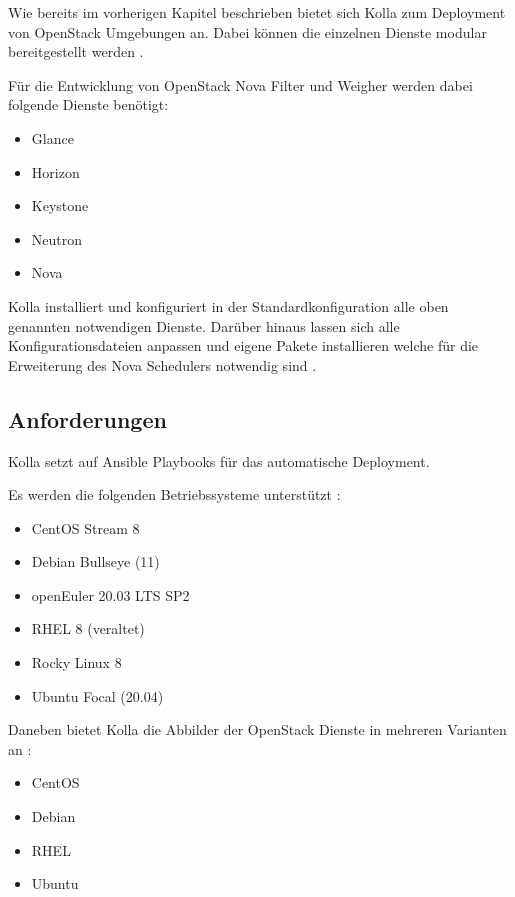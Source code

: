 \documentclass[../Main.tex]{subfiles}
\begin{document}
Wie bereits im vorherigen Kapitel beschrieben bietet sich Kolla zum Deployment
von OpenStack Umgebungen an. Dabei können die einzelnen Dienste modular bereitgestellt werden \citep{KollaAnsible}.

Für die Entwicklung von OpenStack Nova Filter und Weigher werden dabei folgende Dienste benötigt:

\begin{itemize}
    \item Glance
    \item Horizon
    \item Keystone
    \item Neutron
    \item Nova
\end{itemize}

Kolla installiert und konfiguriert in der Standardkonfiguration alle oben genannten notwendigen Dienste.
Darüber hinaus lassen sich alle Konfigurationsdateien anpassen und eigene Pakete installieren welche
für die Erweiterung des Nova Schedulers notwendig sind \citep{KollaAnsible}.

\subsection{Anforderungen}

Kolla setzt auf Ansible Playbooks für das automatische Deployment.

Es werden die folgenden Betriebssysteme unterstützt \citep{KollaSupportMatrix}:

\begin{itemize}
    \item CentOS Stream 8
    \item Debian Bullseye (11)
    \item openEuler 20.03 LTS SP2
    \item RHEL 8 (veraltet)
    \item Rocky Linux 8
    \item Ubuntu Focal (20.04)
\end{itemize}

Daneben bietet Kolla die Abbilder der OpenStack Dienste in mehreren Varianten an \citep{KollaSupportMatrix}:

\begin{itemize}
    \item CentOS
    \item Debian
    \item RHEL
    \item Ubuntu
\end{itemize}
\end{document}

